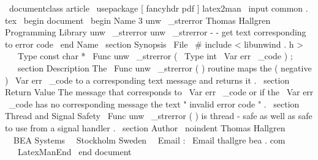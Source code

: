 \
documentclass
{
article
}
\
usepackage
[
fancyhdr
pdf
]
{
latex2man
}
\
input
{
common
.
tex
}
\
begin
{
document
}
\
begin
{
Name
}
{
3
}
{
unw
\
_strerror
}
{
Thomas
Hallgren
}
{
Programming
Library
}
{
unw
\
_strerror
}
unw
\
_strerror
-
-
get
text
corresponding
to
error
code
\
end
{
Name
}
\
section
{
Synopsis
}
\
File
{
\
#
include
<
libunwind
.
h
>
}
\
\
\
Type
{
const
char
*
}
\
Func
{
unw
\
_strerror
}
(
\
Type
{
int
}
\
Var
{
err
\
_code
}
)
;
\
\
\
section
{
Description
}
The
\
Func
{
unw
\
_strerror
}
(
)
routine
maps
the
(
negative
)
\
Var
{
err
\
_code
}
to
a
corresponding
text
message
and
returns
it
.
\
section
{
Return
Value
}
The
message
that
corresponds
to
\
Var
{
err
\
_code
}
or
if
the
\
Var
{
err
\
_code
}
has
no
corresponding
message
the
text
"
invalid
error
code
"
.
\
section
{
Thread
and
Signal
Safety
}
\
Func
{
unw
\
_strerror
}
(
)
is
thread
-
safe
as
well
as
safe
to
use
from
a
signal
handler
.
\
section
{
Author
}
\
noindent
Thomas
Hallgren
\
\
BEA
Systems
\
\
Stockholm
Sweden
\
\
Email
:
\
Email
{
thallgre
bea
.
com
}
\
\
\
LatexManEnd
\
end
{
document
}
